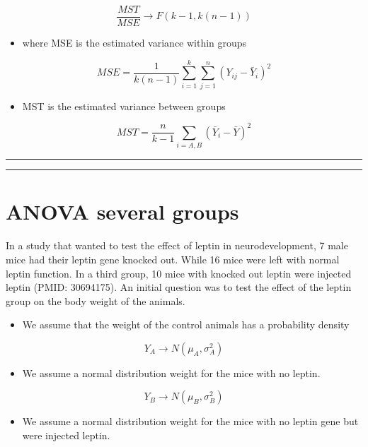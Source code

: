 \documentclass[
]{book}
\providecommand{\tightlist}{%
  \setlength{\itemsep}{0pt}\setlength{\parskip}{0pt}}
\begin{document}
\[\frac{MST}{MSE} \rightarrow F(k-1, k(n-1))\]

\begin{itemize}
\tightlist
\item
  where MSE is the estimated variance within groups
\end{itemize}

\[MSE=\frac{1}{k(n-1)} \sum_{i=1}^k\sum_{j=1}^n(Y_{ij}-\bar{Y}_i)^2\]

\begin{itemize}
\tightlist
\item
  MST is the estimated variance between groups
\end{itemize}

\[MST= \frac{n}{k-1}\sum_{i=A,B}(\bar{Y}_{i}-\bar{Y})^2\]

\begin{center}\rule{0.5\linewidth}{0.5pt}\end{center}

\begin{center}\rule{0.5\linewidth}{0.5pt}\end{center}

\hypertarget{anova-several-groups-2}{%
\section{ANOVA several groups}\label{anova-several-groups-2}}

In a study that wanted to test the effect of leptin in neurodevelopment, 7 male mice had their leptin gene knocked out. While 16 mice were left with normal leptin function. In a third group, 10 mice with knocked out leptin were injected leptin (PMID: 30694175). An initial question was to test the effect of the leptin group on the body weight of the animals.

\begin{itemize}
\tightlist
\item
  We assume that the weight of the control animals has a probability density
\end{itemize}

\[Y_A \rightarrow N(\mu_A, \sigma_A^2)\]

\begin{itemize}
\tightlist
\item
  We assume a normal distribution weight for the mice with no leptin.
\end{itemize}

\[Y_B \rightarrow N(\mu_B, \sigma_B^2)\]

\begin{itemize}
\tightlist
\item
  We assume a normal distribution weight for the mice with no leptin gene but were injected leptin.
\end{itemize}
\end{document}
